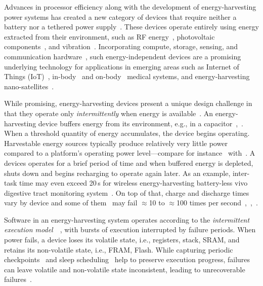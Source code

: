 Advances in processor efficiency along with the development of energy-harvesting power systems has created a new category of devices that require neither a battery nor a tethered power supply~\cite{prasad_comst_2014,lucia_snapl_2017,soyata_csm_2016}. These devices operate entirely using energy extracted from their environment, such as RF energy~\cite{rf_powered_computing_gollakota_2014}, photovoltaic components~\cite{margolies_infocom_2016,margolies_tosn_2016}, and vibration~\cite{gorlatova_sigmetrics_2014}. Incorporating compute, storage, sensing, and communication hardware~\cite{wisp5,moo}, such energy-independent devices are a promising underlying technology for applications in emerging areas such as Internet of Things (IoT)~\cite{ku_cst_2016}, in-body~\cite{nadeau_naturebio_2017} and on-body~\cite{bandodkar_electroanalysis_2015} medical systems, and energy-harvesting nano-satellites~\cite{kicksat}.

While promising, energy-harvesting devices present a unique design challenge in
that they operate only {\em intermittently} when energy is available~\cite{hicks_isca_2017,lucia_snapl_2017}. An
energy-harvesting device buffers energy from its environment, e.g., in a
capacitor~\cite[Fig. 3]{gorlatova_tmc_2013},~\cite[Fig. 1]{gunduz_commag_2014}. When a threshold quantity of energy accumulates, the device begins operating. Harvestable energy sources typically produce relatively very little power compared to a platform's operating power level---compare for instance~\cite[Table III and V]{prasad_comst_2014} with~\cite[Table I]{carrano_cst_2014}. A devices operates for a brief period of time and when buffered energy is depleted, shuts down and begins recharging to operate again later. As an example, inter-task time may even exceed 20\,s for wireless energy-harvesting battery-less vivo digestive tract monitoring system~\cite[Fig. 3c]{nadeau_naturebio_2017}. On top of that, charge and discharge times vary by device and some of them~\cite{wisp} may fail $\approx$10 to $\approx$100 times per second~\cite[Fig. 1]{tan_infocom_2016},~\cite[Fig. 1]{mementos},~\cite[Fig. 3]{nvp}.
%

Software in an energy-harvesting system operates according to the {\em
intermittent execution model}~\cite[Sec. 2]{dino}~\cite[Fig. 2]{lucia_snapl_2017}, with bursts of execution interrupted by failure periods. When power fails, a device loses its volatile state, i.e., registers, stack, SRAM, and retains its non-volatile state, i.e., FRAM, Flash. While capturing periodic checkpoints~\cite{mementos,quickrecall} and sleep scheduling~\cite{dewdrop,hibernus,hibernusplusplus} help to preserve execution progress, failures can leave volatile and non-volatile state inconsistent, leading to unrecoverable failures~\cite{mspcdino,edb}. 

